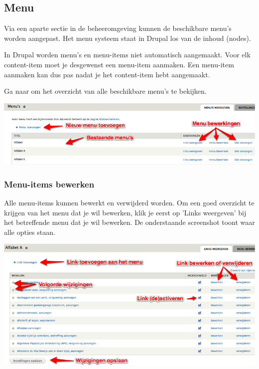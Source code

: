 \subsection{Menu}\label{menu}
Via een aparte sectie in de beheeromgeving kunnen de beschikbare menu's worden aangepast. Het menu systeem staat in Drupal los van de inhoud (nodes). 

In Drupal worden menu's en menu-items niet automatisch aangemaakt. Voor elk content-item moet je desgewenst een menu-item aanmaken. Een menu-item aanmaken kan dus pas nadat je het content-item hebt aangemaakt.

Ga naar  om het overzicht van alle beschikbare menu's te bekijken. 

\bigskip

\begin{center}
	\includegraphics[width=\textwidth]{img/menu1.png}
\end{center}

\subsubsection{Menu-items bewerken}\label{menuitemsbewerken}
Alle menu-items kunnen bewerkt en verwijderd worden. Om een goed overzicht te krijgen van het menu dat je wil bewerken, klik je eerst op 'Links weergeven' bij het betreffende menu dat je wil bewerken. De onderstaande screenshot toont waar alle opties staan.

\bigskip

\begin{center}
	\includegraphics[width=\textwidth]{img/menu2.png}
\end{center}

